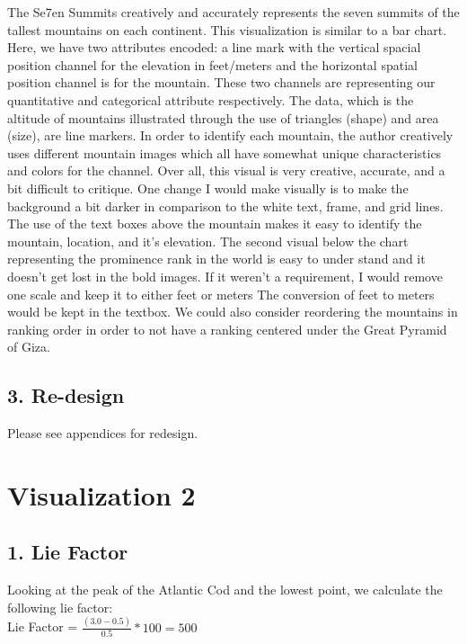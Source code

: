 \documentclass{neu_handout}
\begin{document}
The Se7en Summits creatively and accurately represents the seven summits of the tallest mountains on each continent. This visualization is similar to a bar chart. Here, we have two attributes encoded: a line mark with the vertical spacial position channel for the elevation in feet/meters and the horizontal spatial position channel is for the mountain. These two channels are representing our quantitative and categorical attribute respectively. The data, which is the altitude of mountains illustrated through the use of triangles (shape) and area (size), are line markers. In order to identify each mountain, the author creatively  uses different mountain images which all have somewhat unique characteristics and colors for the channel. Over all, this visual is very creative, accurate, and a bit difficult to critique. One change I would make visually is to make the background a bit darker in comparison to the white text, frame, and grid lines. The use of the text boxes above the mountain makes it easy to identify the mountain, location, and it's elevation. The second visual below the chart representing the prominence rank in the world is easy to under stand and it doesn't get lost in the bold images. If it weren't a requirement, I would remove one scale and keep it to either feet or meters The conversion of feet to meters would be kept in the textbox. We could also consider reordering the mountains in ranking order in order to not have a ranking centered under the Great Pyramid of Giza.


\subsection*{3. Re-design}

Please see appendices for redesign.



\section*{Visualization 2}

\subsection*{1. Lie Factor}

Looking at the peak of the Atlantic Cod and the lowest point, we calculate the following lie factor:\\

Lie Factor = $ \frac{(3.0-0.5)}{0.5} * 100 = 500 $
\\
\end{document}
